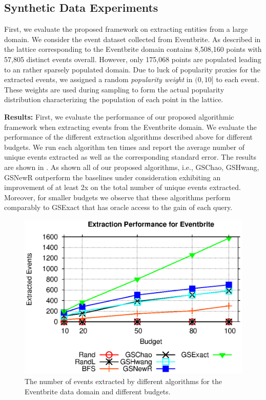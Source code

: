 \subsection{Synthetic Data Experiments}
\label{sec:synthetic}
First, we evaluate the proposed framework on extracting entities from a large domain. We consider the event dataset collected from Eventbrite. As described in  the lattice corresponding to the Eventbrite domain contains 8,508,160 points with 57,805 distinct events overall. However, only 175,068 points are populated leading to an rather sparsely populated domain. Due to luck of popularity proxies for the extracted events, we assigned a random {\em popularity weight} in $(0,10]$ to each event. These weights are used during sampling to form the actual popularity distribution characterizing the population of each point in the lattice. 

\noindent\textbf{Results:} First, we evaluate the performance of our proposed algorithmic framework when extracting events from the Eventbrite domain. We evaluate the performance of the different extraction algorithms described above for different budgets. We run each algorithm ten times and report the average number of unique events extracted as well as the corresponding standard error. The results are shown in . As shown all of our proposed algorithms, i.e., GSChao, GSHwang, GSNewR outperform the baselines under consideration exhibiting an improvement of at least 2x on the total number of unique events extracted. Moreover, for smaller budgets we observe that these algorithms perform comparably to GSExact that has oracle access to the gain of each query.

\begin{figure}[h]
	\begin{center}
	\includegraphics[clip,scale=0.5]{figs/ebExtractionAll.eps}
	\caption{The number of events extracted by different algorithms for the Eventbrite data domain and different budgets.}
	\label{fig:ebextraction}
	\end{center}
	\vspace{-10pt}
\end{figure}

